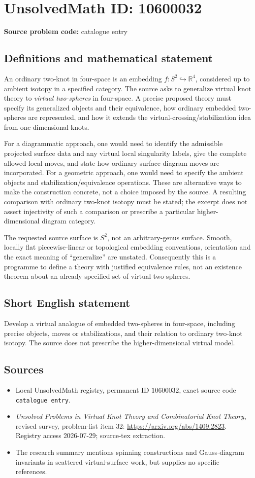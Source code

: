 \documentclass[11pt]{article}
\newcommand{\R}{\mathbb{R}}
\begin{document}
\section*{UnsolvedMath ID: 10600032}
\textbf{Source problem code:} catalogue entry
\subsection{Definitions and mathematical statement}
An ordinary two-knot in four-space is an embedding \(f:S^2\hookrightarrow\R^4\), considered up to ambient isotopy in a specified category. The source asks to generalize virtual knot theory to \emph{virtual two-spheres} in four-space. A precise proposed theory must specify its generalized objects and their equivalence, how ordinary embedded two-spheres are represented, and how it extends the virtual-crossing/stabilization idea from one-dimensional knots.

For a diagrammatic approach, one would need to identify the admissible projected surface data and any virtual local singularity labels, give the complete allowed local moves, and state how ordinary surface-diagram moves are incorporated. For a geometric approach, one would need to specify the ambient objects and stabilization/equivalence operations. These are alternative ways to make the construction concrete, not a choice imposed by the source. A resulting comparison with ordinary two-knot isotopy must be stated; the excerpt does not assert injectivity of such a comparison or prescribe a particular higher-dimensional diagram category.

The requested source surface is \(S^2\), not an arbitrary-genus surface. Smooth, locally flat piecewise-linear or topological embedding conventions, orientation and the exact meaning of ``generalize'' are unstated. Consequently this is a programme to define a theory with justified equivalence rules, not an existence theorem about an already specified set of virtual two-spheres.
\subsection{Short English statement}
Develop a virtual analogue of embedded two-spheres in four-space, including precise objects, moves or stabilizations, and their relation to ordinary two-knot isotopy. The source does not prescribe the higher-dimensional virtual model.
\subsection{Sources}
\begin{itemize}
\item Local UnsolvedMath registry, permanent ID \(10600032\), exact source code \texttt{catalogue entry}.
\item \emph{Unsolved Problems in Virtual Knot Theory and Combinatorial Knot Theory}, revised survey, problem-list item 32: \url{https://arxiv.org/abs/1409.2823}. Registry access 2026-07-29; source-tex extraction.
\item The research summary mentions spinning constructions and Gauss-diagram invariants in scattered virtual-surface work, but supplies no specific references.
\end{itemize}
\end{document}
